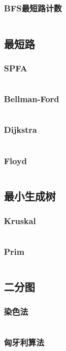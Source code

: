 \documentclass[a4paper,12pt]{article}
\begin{document}
\subsubsection{BFS最短路计数}
\inputminted[breaklines]{c++}{graph/bdfs/sum.cc}
\subsection{最短路} %
\subsubsection{SPFA}
\inputminted[breaklines]{c++}{graph/shortest_path/spfa.cc}
\subsubsection{Bellman-Ford}
\inputminted[breaklines]{c++}{graph/shortest_path/bellman.cc}
\subsubsection{Dijkstra}
\inputminted[breaklines]{c++}{graph/shortest_path/dij.cc}
\subsubsection{Floyd}
\inputminted[breaklines]{c++}{graph/shortest_path/floyd.cc}
\subsection{最小生成树} %
\subsubsection{Kruskal} 
\inputminted[breaklines]{c++}{graph/mst/kruskal.cc}
\subsubsection{Prim} 
\inputminted[breaklines]{c++}{graph/mst/prim.cc}
\subsection{二分图} %
\subsubsection{染色法} 
\inputminted[breaklines]{c++}{graph/2graph/judge.cc}
\subsubsection{匈牙利算法} 
\inputminted[breaklines]{c++}{graph/2graph/xyl.cc}
\end{document}
